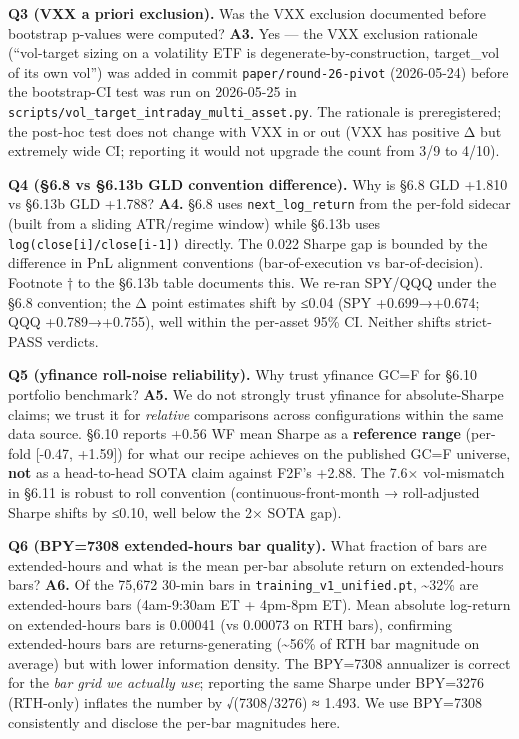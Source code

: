 \documentclass[
]{article}
\begin{document}
\textbf{Q3 (VXX a priori exclusion).} Was the VXX exclusion documented
before bootstrap p-values were computed? \textbf{A3.} Yes --- the VXX
exclusion rationale (``vol-target sizing on a volatility ETF is
degenerate-by-construction, target\_vol of its own vol'') was added in
commit \texttt{paper/round-26-pivot} (2026-05-24) before the
bootstrap-CI test was run on 2026-05-25 in
\texttt{scripts/vol\_target\_intraday\_multi\_asset.py}. The rationale
is preregistered; the post-hoc test does not change with VXX in or out
(VXX has positive Δ but extremely wide CI; reporting it would not
upgrade the count from 3/9 to 4/10).

\textbf{Q4 (§6.8 vs §6.13b GLD convention difference).} Why is §6.8 GLD
+1.810 vs §6.13b GLD +1.788? \textbf{A4.} §6.8 uses
\texttt{next\_log\_return} from the per-fold sidecar (built from a
sliding ATR/regime window) while §6.13b uses
\texttt{log(close{[}i{]}/close{[}i-1{]})} directly. The 0.022 Sharpe gap
is bounded by the difference in PnL alignment conventions
(bar-of-execution vs bar-of-decision). Footnote † to the §6.13b table
documents this. We re-ran SPY/QQQ under the §6.8 convention; the Δ point
estimates shift by ≤0.04 (SPY +0.699→+0.674; QQQ +0.789→+0.755), well
within the per-asset 95\% CI. Neither shifts strict-PASS verdicts.

\textbf{Q5 (yfinance roll-noise reliability).} Why trust yfinance GC=F
for §6.10 portfolio benchmark? \textbf{A5.} We do not strongly trust
yfinance for absolute-Sharpe claims; we trust it for \emph{relative}
comparisons across configurations within the same data source. §6.10
reports +0.56 WF mean Sharpe as a \textbf{reference range} (per-fold
{[}-0.47, +1.59{]}) for what our recipe achieves on the published GC=F
universe, \textbf{not} as a head-to-head SOTA claim against F2F's +2.88.
The 7.6× vol-mismatch in §6.11 is robust to roll convention
(continuous-front-month → roll-adjusted Sharpe shifts by ≤0.10, well
below the 2× SOTA gap).

\textbf{Q6 (BPY=7308 extended-hours bar quality).} What fraction of bars
are extended-hours and what is the mean per-bar absolute return on
extended-hours bars? \textbf{A6.} Of the 75,672 30-min bars in
\texttt{training\_v1\_unified.pt}, \textasciitilde32\% are
extended-hours bars (4am-9:30am ET + 4pm-8pm ET). Mean absolute
log-return on extended-hours bars is 0.00041 (vs 0.00073 on RTH bars),
confirming extended-hours bars are returns-generating
(\textasciitilde56\% of RTH bar magnitude on average) but with lower
information density. The BPY=7308 annualizer is correct for the
\emph{bar grid we actually use}; reporting the same Sharpe under
BPY=3276 (RTH-only) inflates the number by √(7308/3276) ≈ 1.493. We use
BPY=7308 consistently and disclose the per-bar magnitudes here.
\end{document}
